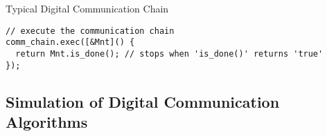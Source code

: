 \begin{frame}{Typical Digital Communication Chain}
\begin{overprint}
\begin{verbatim}
// execute the communication chain
comm_chain.exec([&Mnt]() {
  return Mnt.is_done(); // stops when 'is_done()' returns 'true'
});
  \end{verbatim}
  \end{overprint}
\end{frame}

\subsection[Functionnal Simulator]{Simulation of Digital Communication Algorithms}


